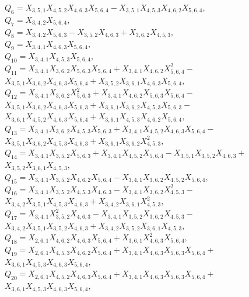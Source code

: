 \documentclass[10pt]{beamer}
\begin{document}
{$Q_{6}=X_{3,5,1}X_{4,5,2}X_{4,6,3}X_{5,6,4}-X_{3,5,1}X_{4,5,3}X_{4,6,2}X_{5,6,4},$\\
$Q_{7}=X_{3,4,2}X_{5,6,4},$\\
$Q_{8}=X_{3,4,2}X_{5,6,3}-X_{3,5,2}X_{4,6,3}+X_{3,6,2}X_{4,5,3},$\\
$Q_{9}=X_{3,4,1}X_{4,6,3}X_{5,6,4},$\\
$Q_{10}=X_{3,4,1}X_{4,5,3}X_{5,6,4},$\\
$Q_{11}=X_{3,4,1}X_{3,6,2}X_{5,6,3}X_{5,6,4}+X_{3,4,1}X_{4,6,2}X_{5,6,4}^2-$\\
$X_{3,5,1}X_{3,6,2}X_{4,6,3}X_{5,6,4}+X_{3,5,2}X_{3,6,1}X_{4,6,3}X_{5,6,4},$\\
$Q_{12}=X_{3,4,1}X_{3,6,2}X_{5,6,3}^2+X_{3,4,1}X_{4,6,2}X_{5,6,3}X_{5,6,4}-$\\
$X_{3,5,1}X_{3,6,2}X_{4,6,3}X_{5,6,3}+X_{3,6,1}X_{3,6,2}X_{4,5,3}X_{5,6,3}-$\\
$X_{3,6,1}X_{4,5,2}X_{4,6,3}X_{5,6,4}+X_{3,6,1}X_{4,5,3}X_{4,6,2}X_{5,6,4},$\\
$Q_{13}=X_{3,4,1}X_{3,6,2}X_{4,5,3}X_{5,6,3}+X_{3,4,1}X_{4,5,2}X_{4,6,3}X_{5,6,4}-$\\
$X_{3,5,1}X_{3,6,2}X_{4,5,3}X_{4,6,3}+X_{3,6,1}X_{3,6,2}X_{4,5,3}^2,$\\
$Q_{14}=X_{3,4,1}X_{3,5,2}X_{5,6,3}+X_{3,4,1}X_{4,5,2}X_{5,6,4}-X_{3,5,1}X_{3,5,2}X_{4,6,3}+$\\
$X_{3,5,2}X_{3,6,1}X_{4,5,3},$\\
$Q_{15}=X_{3,4,1}X_{3,5,2}X_{4,6,2}X_{5,6,4}-X_{3,4,1}X_{3,6,2}X_{4,5,2}X_{5,6,4},$\\
$Q_{16}=X_{3,4,1}X_{3,5,2}X_{4,5,3}X_{4,6,3}-X_{3,4,1}X_{3,6,2}X_{4,5,3}^2-$\\
$X_{3,4,2}X_{3,5,1}X_{4,5,3}X_{4,6,3}+X_{3,4,2}X_{3,6,1}X_{4,5,3}^2,$\\
$Q_{17}=X_{3,4,1}X_{3,5,2}^2X_{4,6,3}-X_{3,4,1}X_{3,5,2}X_{3,6,2}X_{4,5,3}-$\\
$X_{3,4,2}X_{3,5,1}X_{3,5,2}X_{4,6,3}+X_{3,4,2}X_{3,5,2}X_{3,6,1}X_{4,5,3},$\\
$Q_{18}=X_{2,6,1}X_{4,6,2}X_{4,6,3}X_{5,6,4}+X_{3,6,1}X_{4,6,3}^2X_{5,6,4},$\\
$Q_{19}=X_{2,6,1}X_{4,5,3}X_{4,6,2}X_{5,6,4}+X_{3,4,1}X_{4,6,3}X_{5,6,3}X_{5,6,4}+$\\
$X_{3,6,1}X_{4,5,3}X_{4,6,3}X_{5,6,4},$\\
$Q_{20}=X_{2,6,1}X_{4,5,2}X_{4,6,3}X_{5,6,4}+X_{3,4,1}X_{4,6,3}X_{5,6,3}X_{5,6,4}+$\\
$X_{3,6,1}X_{4,5,3}X_{4,6,3}X_{5,6,4},$\\
}
\end{document}
